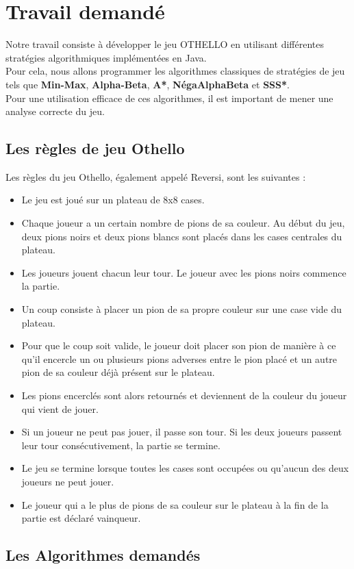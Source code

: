 \documentclass[12pt]{article}
\begin{document}
	\section{Travail demandé}	
Notre travail consiste à développer le jeu OTHELLO en utilisant différentes stratégies algorithmiques implémentées en Java.\\ Pour cela, nous allons programmer les algorithmes classiques de stratégies de jeu tels que \textbf{Min-Max}, \textbf{Alpha-Beta}, \textbf{A*}, \textbf{NégaAlphaBeta }et \textbf{SSS*}.\\ Pour une utilisation efficace de ces algorithmes, il est important de mener une analyse correcte du jeu.
\subsection{Les règles de jeu Othello}
 Les règles du jeu Othello, également appelé Reversi, sont les suivantes :\\
\begin{itemize}

	
	\item	Le jeu est joué sur un plateau de 8x8 cases.
	\item	Chaque joueur a un certain nombre de pions de sa couleur. Au début du jeu, deux pions noirs et deux pions blancs sont placés dans les cases centrales du plateau.
	\item Les joueurs jouent chacun leur tour. Le joueur avec les pions noirs commence la partie.
		\item Un coup consiste à placer un pion de sa propre couleur sur une case vide du plateau.
		\item Pour que le coup soit valide, le joueur doit placer son pion de manière à ce qu'il encercle un ou plusieurs pions adverses entre le pion placé et un autre pion de sa couleur déjà présent sur le plateau.
 	\item	Les pions encerclés sont alors retournés et deviennent de la couleur du joueur qui vient de jouer.
	\item	Si un joueur ne peut pas jouer, il passe son tour. Si les deux joueurs passent leur tour consécutivement, la partie se termine.
		\item Le jeu se termine lorsque toutes les cases sont occupées ou qu'aucun des deux joueurs ne peut jouer.
	\item	Le joueur qui a le plus de pions de sa couleur sur le plateau à la fin de la partie est déclaré vainqueur.
\end{itemize}
\subsection{Les Algorithmes demandés}
\end{document}
